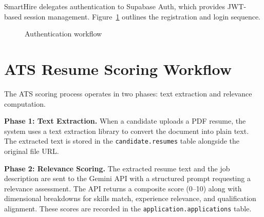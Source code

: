 SmartHire delegates authentication to Supabase Auth, which provides JWT-based session management. Figure~\ref{fig:auth-flow} outlines the registration and login sequence.

\begin{figure}[htbp]
\centering
{}
\caption{Authentication workflow}
\label{fig:auth-flow}
\end{figure}

\section{ATS Resume Scoring Workflow}
\label{sec:ats-workflow}

The ATS scoring process operates in two phases: text extraction and relevance computation.

\textbf{Phase 1: Text Extraction.} When a candidate uploads a PDF resume, the system uses a text extraction library to convert the document into plain text. The extracted text is stored in the \texttt{candidate.resumes} table alongside the original file URL.

\textbf{Phase 2: Relevance Scoring.} The extracted resume text and the job description are sent to the Gemini API with a structured prompt requesting a relevance assessment. The API returns a composite score (0--10) along with dimensional breakdowns for skills match, experience relevance, and qualification alignment. These scores are recorded in the \texttt{application.applications} table.


